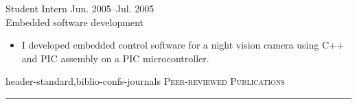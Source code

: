\documentclass[10pt]{article}
\newcommand{\mysec}[1]{\vspace{2em}\textsc{\large #1}\vspace{1mm}\hrule\vspace{2mm}}
\newcommand{\myssub}[1]{\hspace*{2mm}\parbox{163mm}{#1}\vspace*{2mm}}
\begin{document}
\myssub{Student Intern \hfill Jun. 2005--Jul. 2005 \\
Embedded software development
\vspace{-1mm}
\begin{itemize}
\setlength\itemsep{0em}
\item{I developed embedded control software for a night vision camera using C++ and PIC assembly on a PIC microcontroller.}
\end{itemize}
}




\begin{btSect}{header-standard,biblio-confs-journals}
\mysec{Peer-reviewed Publications}
\btPrintAll
\end{btSect}

\newpage
\end{document}
